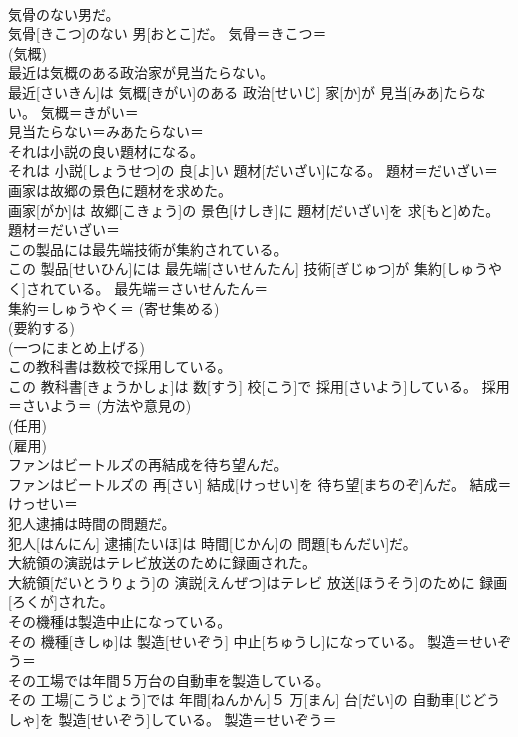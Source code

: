 \documentclass[8pt]{extreport}
\begin{document}
\begin{CJK}{UTF8}{min}
{\\	気骨のない男だ。	
\\	気骨[きこつ]のない 男[おとこ]だ。	気骨＝きこつ＝ 
\\	(気概)
\\	最近は気概のある政治家が見当たらない。	
\\	最近[さいきん]は 気概[きがい]のある 政治[せいじ] 家[か]が 見当[みあ]たらない。	気概＝きがい＝ 
\\	見当たらない＝みあたらない＝ 
\\	それは小説の良い題材になる。	
\\	それは 小説[しょうせつ]の 良[よ]い 題材[だいざい]になる。	題材＝だいざい＝ 
\\	画家は故郷の景色に題材を求めた。	
\\	画家[がか]は 故郷[こきょう]の 景色[けしき]に 題材[だいざい]を 求[もと]めた。	題材＝だいざい＝ 
\\	この製品には最先端技術が集約されている。	
\\	この 製品[せいひん]には 最先端[さいせんたん] 技術[ぎじゅつ]が 集約[しゅうやく]されている。	最先端＝さいせんたん＝ 
\\	集約＝しゅうやく＝ (寄せ集める) 
\\	(要約する) 
\\	(一つにまとめ上げる) 
\\	この教科書は数校で採用している。	
\\	この 教科書[きょうかしょ]は 数[すう] 校[こう]で 採用[さいよう]している。	採用＝さいよう＝ (方法や意見の) 
\\	(任用) 
\\	(雇用) 
\\	ファンはビートルズの再結成を待ち望んだ。	
\\	ファンはビートルズの 再[さい] 結成[けっせい]を 待ち望[まちのぞ]んだ。	結成＝けっせい＝ 
\\	犯人逮捕は時間の問題だ。	
\\	犯人[はんにん] 逮捕[たいほ]は 時間[じかん]の 問題[もんだい]だ。	
\\	大統領の演説はテレビ放送のために録画された。	
\\	大統領[だいとうりょう]の 演説[えんぜつ]はテレビ 放送[ほうそう]のために 録画[ろくが]された。	
\\	その機種は製造中止になっている。	
\\	その 機種[きしゅ]は 製造[せいぞう] 中止[ちゅうし]になっている。	製造＝せいぞう＝ 
\\	その工場では年間５万台の自動車を製造している。	
\\	その 工場[こうじょう]では 年間[ねんかん]５ 万[まん] 台[だい]の 自動車[じどうしゃ]を 製造[せいぞう]している。	製造＝せいぞう＝ 
}
\end{CJK}
\end{document}

